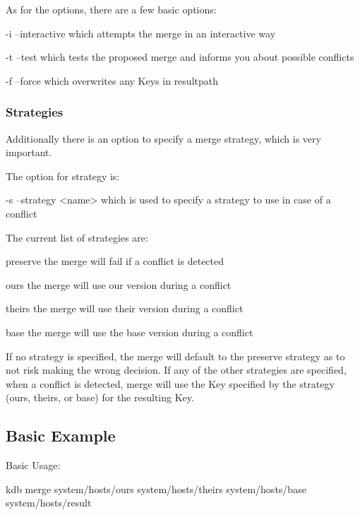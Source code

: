 As for the options, there are a few basic options\+: \begin{DoxyVerb}    -i  --interactive               which attempts the merge in an interactive way

    -t  --test                      which tests the proposed merge and informs you about possible conflicts

    -f --force                      which overwrites any Keys in resultpath
\end{DoxyVerb}


\subsubsection*{Strategies}

Additionally there is an option to specify a merge strategy, which is very important.

The option for strategy is\+: \begin{DoxyVerb}    -s --strategy <name>            which is used to specify a strategy to use in case of a conflict
\end{DoxyVerb}


The current list of strategies are\+: \begin{DoxyVerb}    preserve                        the merge will fail if a conflict is detected

    ours                            the merge will use our version during a conflict

    theirs                          the merge will use their version during a conflict

    base                            the merge will use the base version during a conflict
\end{DoxyVerb}


If no strategy is specified, the merge will default to the preserve strategy as to not risk making the wrong decision. If any of the other strategies are specified, when a conflict is detected, merge will use the Key specified by the strategy (ours, theirs, or base) for the resulting Key.

\subsection*{Basic Example}

Basic Usage\+: \begin{DoxyVerb}    kdb merge system/hosts/ours system/hosts/theirs system/hosts/base system/hosts/result
\end{DoxyVerb}


